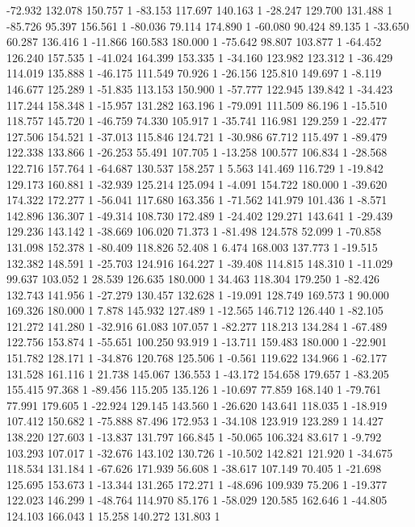 	-72.932 132.078 150.757 1
	-83.153 117.697 140.163 1
	-28.247 129.700 131.488 1
	-85.726 95.397 156.561 1
	-80.036 79.114 174.890 1
	-60.080 90.424 89.135 1
	-33.650 60.287 136.416 1
	-11.866 160.583 180.000 1
	-75.642 98.807 103.877 1
	-64.452 126.240 157.535 1
	-41.024 164.399 153.335 1
	-34.160 123.982 123.312 1
	-36.429 114.019 135.888 1
	-46.175 111.549 70.926 1
	-26.156 125.810 149.697 1
	-8.119 146.677 125.289 1
	-51.835 113.153 150.900 1
	-57.777 122.945 139.842 1
	-34.423 117.244 158.348 1
	-15.957 131.282 163.196 1
	-79.091 111.509 86.196 1
	-15.510 118.757 145.720 1
	-46.759 74.330 105.917 1
	-35.741 116.981 129.259 1
	-22.477 127.506 154.521 1
	-37.013 115.846 124.721 1
	-30.986 67.712 115.497 1
	-89.479 122.338 133.866 1
	-26.253 55.491 107.705 1
	-13.258 100.577 106.834 1
	-28.568 122.716 157.764 1
	-64.687 130.537 158.257 1
	5.563 141.469 116.729 1
	-19.842 129.173 160.881 1
	-32.939 125.214 125.094 1
	-4.091 154.722 180.000 1
	-39.620 174.322 172.277 1
	-56.041 117.680 163.356 1
	-71.562 141.979 101.436 1
	-8.571 142.896 136.307 1
	-49.314 108.730 172.489 1
	-24.402 129.271 143.641 1
	-29.439 129.236 143.142 1
	-38.669 106.020 71.373 1
	-81.498 124.578 52.099 1
	-70.858 131.098 152.378 1
	-80.409 118.826 52.408 1
	6.474 168.003 137.773 1
	-19.515 132.382 148.591 1
	-25.703 124.916 164.227 1
	-39.408 114.815 148.310 1
	-11.029 99.637 103.052 1
	28.539 126.635 180.000 1
	34.463 118.304 179.250 1
	-82.426 132.743 141.956 1
	-27.279 130.457 132.628 1
	-19.091 128.749 169.573 1
	90.000 169.326 180.000 1
	7.878 145.932 127.489 1
	-12.565 146.712 126.440 1
	-82.105 121.272 141.280 1
	-32.916 61.083 107.057 1
	-82.277 118.213 134.284 1
	-67.489 122.756 153.874 1
	-55.651 100.250 93.919 1
	-13.711 159.483 180.000 1
	-22.901 151.782 128.171 1
	-34.876 120.768 125.506 1
	-0.561 119.622 134.966 1
	-62.177 131.528 161.116 1
	21.738 145.067 136.553 1
	-43.172 154.658 179.657 1
	-83.205 155.415 97.368 1
	-89.456 115.205 135.126 1
	-10.697 77.859 168.140 1
	-79.761 77.991 179.605 1
	-22.924 129.145 143.560 1
	-26.620 143.641 118.035 1
	-18.919 107.412 150.682 1
	-75.888 87.496 172.953 1
	-34.108 123.919 123.289 1
	14.427 138.220 127.603 1
	-13.837 131.797 166.845 1
	-50.065 106.324 83.617 1
	-9.792 103.293 107.017 1
	-32.676 143.102 130.726 1
	-10.502 142.821 121.920 1
	-34.675 118.534 131.184 1
	-67.626 171.939 56.608 1
	-38.617 107.149 70.405 1
	-21.698 125.695 153.673 1
	-13.344 131.265 172.271 1
	-48.696 109.939 75.206 1
	-19.377 122.023 146.299 1
	-48.764 114.970 85.176 1
	-58.029 120.585 162.646 1
	-44.805 124.103 166.043 1
	15.258 140.272 131.803 1
